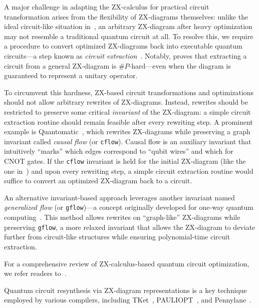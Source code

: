 \documentclass[a4paper,onecolumn,11pt,unpublished]{quantumarticle}
\begin{document}
A major challenge in adapting the ZX-calculus for practical circuit transformation arises from the flexibility of ZX-diagrams themselves: unlike the ideal circuit-like situation in~, an arbitrary ZX-diagram after heavy optimization may not resemble a traditional quantum circuit at all. To resolve this, we require a procedure to convert optimized ZX-diagrams back into executable quantum circuits---a step known as \textit{circuit extraction}~\cite{Duncan2020Graphtheoretic, backensThereBackAgain2021}. Notably, \cite{beaudrapCircuitExtractionZXdiagrams2022} proves that extracting a circuit from a general ZX-diagram is \(\#P\)-hard---even when the diagram is guaranteed to represent a unitary operator.

To circumvent this hardness, ZX-based circuit transformations and optimizations should not allow arbitrary rewrites of ZX-diagrams. Instead, rewrites should be restricted to preserve some critical \textit{invariant} of the ZX-diagram: a simple circuit extraction routine should remain feasible after every rewriting step.
A prominent example is Quantomatic~\cite{faganOptimisingCliffordCircuits2019}, which rewrites ZX-diagrams while preserving a graph invariant called \textit{causal flow} (or \texttt{cflow}). Causal flow is an auxiliary invariant that intuitively ``marks'' which edges correspond to ``qubit wires'' and which for CNOT gates. If the \texttt{cflow} invariant is held for the initial ZX-diagram (like the one in~) and upon every rewriting step, a simple circuit extraction routine would suffice to convert an optimized ZX-diagram back to a circuit.


An alternative invariant-based approach leverages another invariant named \textit{generalized flow} (or \texttt{gflow})---a concept originally developed for one-way quantum computing~\cite{mcelvanneyFlowpreservingZXcalculusRewrite2023, backensThereBackAgain2021, Duncan2020Graphtheoretic, Kissinger2020Reducing}. This method allows rewrites on ``graph-like'' ZX-diagrams while preserving \texttt{gflow}, a more relaxed invariant that allows the ZX-diagram to deviate further from circuit-like structures while ensuring polynomial-time circuit extraction.

For a comprehensive review of ZX-calculus-based quantum circuit optimization, we refer readers to~\cite{fischbachReviewQuantumCircuit2025}.

Quantum circuit resynthesis via ZX-diagram representations is a key technique employed by various compilers, including TKet~\cite{sivarajah2020t, cowtanPhaseGadgetSynthesis2020}, PAULIOPT~\cite{gogiosoAnnealingOptimisationMixed2023}, and Pennylane~\cite{bergholmPennyLaneAutomaticDifferentiation2022}.
\end{document}
